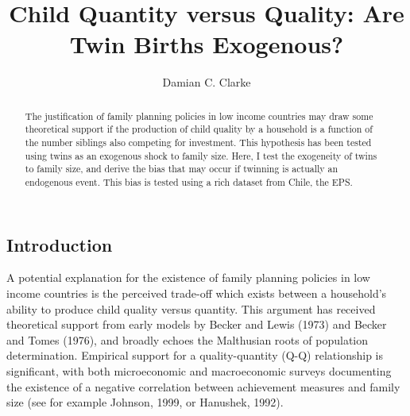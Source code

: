 \documentclass{article}[11pt,subeqn]
\title{Child Quantity versus Quality: Are Twin Births Exogenous?}
\author{Damian C. Clarke}
\begin{document}
\begin{spacing}{1.25}

\maketitle
\begin{abstract}
The justification of family planning policies in low income countries may draw some theoretical support 
if the production of child quality by a household is a function of the number siblings also competing
for investment.  This hypothesis has been tested using twins as an exogenous shock to family size.  Here, I test
the exogeneity of twins to family size, and derive the bias that may occur if twinning is actually
an endogenous event.  This bias is tested using a rich dataset from Chile, the EPS.
\end{abstract}

\section{Introduction}
A potential explanation for the existence of family planning policies in low income countries is the
perceived trade-off which exists between a household's ability to produce child quality versus quantity.
This argument has received theoretical support from early models by Becker and Lewis
(1973) and Becker and Tomes (1976), and broadly echoes the Malthusian roots of population determination.
Empirical support for a quality-quantity (Q-Q) relationship is significant, with both microeconomic and
macroeconomic surveys documenting the existence of a negative correlation between achievement measures and
family size (see for example Johnson, 1999, or Hanushek, 1992).


\end{spacing}
\end{document}
